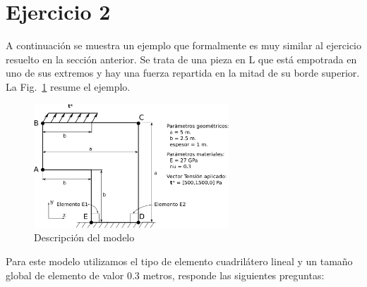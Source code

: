 \documentclass[a4paper,12pt]{article}
\begin{document}
\newpage
\section{Ejercicio  2}
A continuación se muestra un ejemplo que formalmente es muy similar al
ejercicio resuelto en la sección anterior. Se trata de una pieza en L
que está empotrada en uno de sus extremos y hay una fuerza repartida
en la mitad de su borde superior. La Fig.~\ref{figu115} resume el
ejemplo.

\begin{figure}[!h]
  \begin{center}
    \includegraphics[width=0.65\textwidth]{./figs/imagen115}
  \end{center}
  \caption{Descripción del modelo}
  \label{figu115}
\end{figure}

Para este modelo utilizamos el tipo de elemento cuadrilátero lineal y un tamaño global
de elemento de valor $0.3$ metros, responde las siguientes preguntas:
\end{document}
